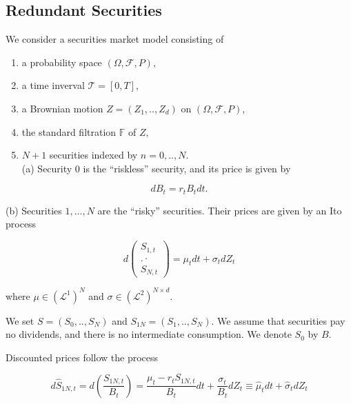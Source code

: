 \documentclass[\topdir/lecture\_notes.tex]{subfiles}
\begin{document}
\subsection{Redundant Securities}
We consider a securities market model consisting of

\begin{enumerate}
  \item a probability space \((\Omega, \mathcal{F}, P)\),

  \item a time inverval \(\mathcal{T}=[0, T]\),

  \item a Brownian motion \(Z=\left(Z_{1}, . ., Z_{d}\right)\) on \((\Omega, \mathcal{F}, P)\),

  \item the standard filtration \(\mathbb{F}\) of \(Z\),

  \item \(N+1\) securities indexed by \(n=0, . ., N\).\\
(a) Security 0 is the ``riskless'' security, and its price is given by

\end{enumerate}

\begin{equation*}
d B_{t}=r_{t} B_{t} d t .
\end{equation*}

(b) Securities \(1, \ldots, N\) are the ``risky'' securities. Their prices are given by an Ito process

\begin{equation*}
d\left(\begin{array}{c}
S_{1, t} \\
. \cdot \\
S_{N, t}
\end{array}\right)=\mu_{t} d t+\sigma_{t} d Z_{t}
\end{equation*}

where \(\mu \in\left(\mathcal{L}^{1}\right)^{N}\) and \(\sigma \in\left(\mathcal{L}^{2}\right)^{N \times d}\).

We set \(S=\left(S_{0}, . ., S_{N}\right)\) and \(S_{1 N}=\left(S_{1}, . ., S_{N}\right)\). We assume that securities pay no dividends, and there is no intermediate consumption. We denote \(S_{0}\) by \(B\).

Discounted prices follow the process

\begin{equation*}
d \hat{S}_{1 N, t}=d\left(\frac{S_{1 N, t}}{B_{t}}\right)=\frac{\mu_{t}-r_{t} S_{1 N, t}}{B_{t}} d t+\frac{\sigma_{t}}{B_{t}} d Z_{t} \equiv \hat{\mu}_{t} d t+\hat{\sigma}_{t} d Z_{t}
\end{equation*}
\end{document}

